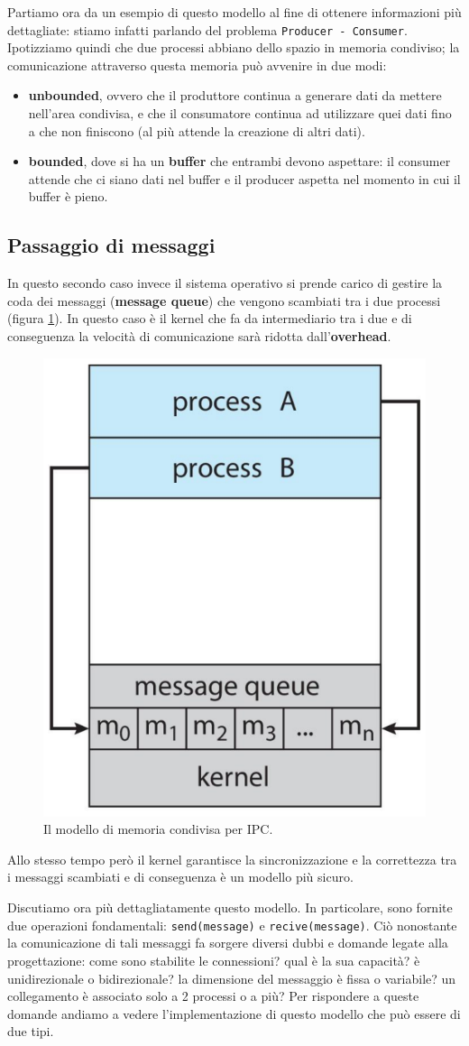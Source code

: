 Partiamo ora da un esempio di questo modello al fine di ottenere informazioni più dettagliate: stiamo infatti parlando del problema \texttt{Producer - Consumer}. Ipotizziamo quindi che due processi abbiano dello spazio in memoria condiviso; la comunicazione attraverso questa memoria può avvenire in due modi:
\vspace{-5px}
\begin{itemize}
\setlength{\itemsep}{-.15 em}
    \item \textbf{unbounded}, ovvero che il produttore continua a generare dati da mettere nell'area condivisa, e che il consumatore continua ad utilizzare quei dati fino a che non finiscono (al più attende la creazione di altri dati).
    \item \textbf{bounded}, dove si ha un \textbf{buffer} che entrambi devono aspettare: il consumer attende che ci siano dati nel buffer e il producer aspetta nel momento in cui il buffer è pieno. 
\end{itemize}

% 
\subsection{Passaggio di messaggi}
In questo secondo caso invece il sistema operativo si prende carico di gestire la coda dei messaggi (\textbf{message queue}) che vengono scambiati tra i due processi (figura \ref{fig:message_passing}). In questo caso è il kernel che fa da intermediario tra i due e di conseguenza la velocità di comunicazione sarà ridotta dall'\textbf{overhead}.
\begin{figure}[h]
    \centering
    \includegraphics[width = .25\textwidth]{../res/imgs/processes/message_passing.png}
    \caption{Il modello di memoria condivisa per IPC.}
    \label{fig:message_passing}
\end{figure}
Allo stesso tempo però il kernel garantisce la sincronizzazione e la correttezza tra i messaggi scambiati e di conseguenza è un modello più sicuro. 

Discutiamo ora più dettagliatamente questo modello. In particolare, sono fornite due operazioni fondamentali: \texttt{send(message)} e \texttt{recive(message)}. Ciò nonostante la comunicazione di tali messaggi fa sorgere diversi dubbi e domande legate alla progettazione: come sono stabilite le connessioni? qual è la sua capacità? è unidirezionale o bidirezionale? la dimensione del messaggio è fissa o variabile? un collegamento è associato solo a 2 processi o a più? Per rispondere a queste domande andiamo a vedere l'implementazione di questo modello che può essere di due tipi.

